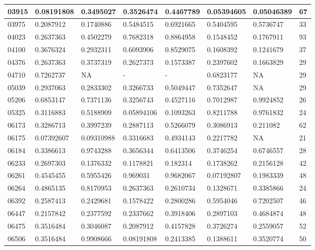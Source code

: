 \begin{anexosenv}
\begin{table}[H]
{\begin{tabular}{|l|l|l|l|l|l|l|l|}
						03915 & 0.08191808 & 0.3495027 & 0.3526474 & 0.4467789 & 0.05394605 & 0.05046389 & 67 \\ \hline
						03975 & 0.2087912 & 0.1740886 & 0.5484515 & 0.6921665 & 0.5404595 & 0.5736747 & 33 \\ \hline
						04023 & 0.2637363 & 0.4502279 & 0.7682318 & 0.8864958 & 0.1548452 & 0.1767911 & 93 \\ \hline
						04100 & 0.3676324 & 0.2932311 & 0.6093906 & 0.8529075 & 0.1608392 & 0.1241679 & 37 \\ \hline
						04376 & 0.2637363 & 0.3737319 & 0.2627373 & 0.1573387 & 0.2397602 & 0.1663829 & 29 \\ \hline
						04710 & 0.7262737 & NA & - & - & 0.6823177 & NA & 29 \\ \hline
						05039 & 0.2937063 & 0.2833302 & 0.3266733 & 0.5049447 & 0.7352647 & NA & 29 \\ \hline
						05206 & 0.6853147 & 0.7371136 & 0.3256743 & 0.4527116 & 0.7012987 & 0.9924852 & 26 \\ \hline
						05325 & 0.3116883 & 0.5188909 & 0.05894106 & 0.1093263 & 0.8211788 & 0.9761832 & 24 \\ \hline
						06173 & 0.3286713 & 0.3997239 & 0.2887113 & 0.5266079 & 0.3086913 & 0.211082 & 62 \\ \hline
						06175 & 0.07392607 & 0.09310988 & 0.3316683 & 0.4934143 & 0.2217782 & NA & 21 \\ \hline
						06184 & 0.3386613 & 0.9743288 & 0.3656344 & 0.6413506 & 0.3746254 & 0.6746557 & 28 \\ \hline
						06233 & 0.2697303 & 0.1376332 & 0.1178821 & 0.182314 & 0.1738262 & 0.2156128 & 42 \\ \hline
						06261 & 0.4545455 & 0.5955426 & 0.969031 & 0.9682067 & 0.07192807 & 0.1983339 & 48 \\ \hline
						06264 & 0.4865135 & 0.8170953 & 0.2637363 & 0.2610734 & 0.1328671 & 0.3385866 & 24 \\ \hline
						06392 & 0.2587413 & 0.2429681 & 0.1578422 & 0.2800286 & 0.5954046 & 0.7202507 & 46 \\ \hline
						06447 & 0.2157842 & 0.2377592 & 0.2337662 & 0.3918406 & 0.2897103 & 0.4684874 & 48 \\ \hline
						06475 & 0.3516484 & 0.3046087 & 0.2087912 & 0.4157828 & 0.3726274 & 0.2559057 & 52 \\ \hline
						06506 & 0.3516484 & 0.9908666 & 0.08191808 & 0.2413385 & 0.1388611 & 0.3520774 & 50 \\ \hline

\end{tabular}}
\end{table}
\end{anexosenv}
